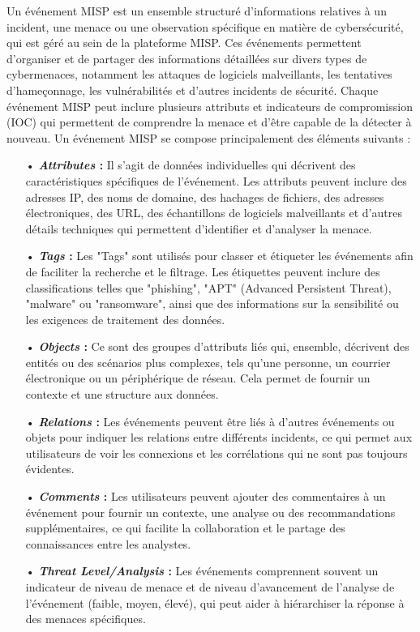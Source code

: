 \newpage

\label{chap3:mispEvents}
Un événement MISP est un ensemble structuré d'informations relatives à un incident, une menace ou une observation spécifique en matière de cybersécurité, qui est géré au sein de la plateforme MISP. Ces événements permettent d'organiser et de partager des informations détaillées sur divers types de cybermenaces, notamment les attaques de logiciels malveillants, les tentatives d'hameçonnage, les vulnérabilités et d'autres incidents de sécurité. Chaque événement MISP peut inclure plusieurs attributs et indicateurs de compromission (IOC) qui permettent de comprendre la menace et d'être capable de la détecter à nouveau. Un événement MISP se compose principalement des éléments suivants :\\

\begin{itemize}[itemsep=1em]
    \item[•] \textbf{\textit{Attributes} :} Il s'agit de données individuelles qui décrivent des caractéristiques spécifiques de l'événement. Les attributs peuvent inclure des adresses IP, des noms de domaine, des hachages de fichiers, des adresses électroniques, des URL, des échantillons de logiciels malveillants et d'autres détails techniques qui permettent d'identifier et d'analyser la menace.
    \item[•] \textbf{\textit{Tags} :} Les "Tags" sont utilisés pour classer et étiqueter les événements afin de faciliter la recherche et le filtrage. Les étiquettes peuvent inclure des classifications telles que "phishing", "APT" (Advanced Persistent Threat), "malware" ou "ransomware", ainsi que des informations sur la sensibilité ou les exigences de traitement des données.
    \item[•] \textbf{\textit{Objects} :} Ce sont des groupes d'attributs liés qui, ensemble, décrivent des entités ou des scénarios plus complexes, tels qu'une personne, un courrier électronique ou un périphérique de réseau. Cela permet de fournir un contexte et une structure aux données.
    \item[•] \textbf{\textit{Relations }:} Les événements peuvent être liés à d'autres événements ou objets pour indiquer les relations entre différents incidents, ce qui permet aux utilisateurs de voir les connexions et les corrélations qui ne sont pas toujours évidentes.
    \item[•] \textbf{\textit{Comments }:} Les utilisateurs peuvent ajouter des commentaires à un événement pour fournir un contexte, une analyse ou des recommandations supplémentaires, ce qui facilite la collaboration et le partage des connaissances entre les analystes.
    \item[•] \textbf{\textit{Threat Level/Analysis} :} Les événements comprennent souvent un indicateur de niveau de menace et de niveau d'avancement de l'analyse de l'événement (faible, moyen, élevé), qui peut aider à hiérarchiser la réponse à des menaces spécifiques.\\
\end{itemize}

